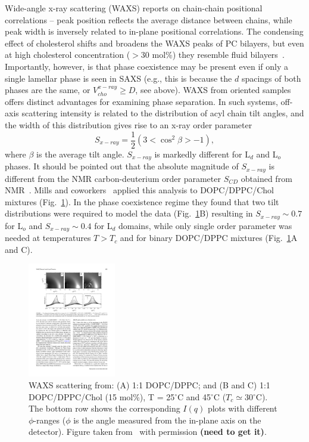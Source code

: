 \documentclass[8.5pt,twoside,twocolumn]{article}
\begin{document}
Wide-angle x-ray scattering (WAXS) reports on chain-chain positional correlations -- peak position reflects the average distance between chains, while peak width is inversely related to in-plane positional correlations. The condensing effect of cholesterol shifts and broadens the WAXS peaks of PC bilayers, but even at high cholesterol concentration ($> 30$ mol\%) they resemble fluid bilayers~\cite{Engelman.1972}. Importantly, however, is that phase coexistence may be present even if only a single lamellar phase is seen in SAXS (e.g., this is because the $d$ spacings of both phases are the same, or $V_{cho}^{x-ray} \ge D$, see above). WAXS from oriented samples offers distinct advantages for examining phase separation. In such systems, off-axis scattering intensity is related to the distribution of acyl chain tilt angles, and the width of this distribution gives rise to an x-ray order parameter~\cite{Mills.2008b,Mills.2008}
%
\begin{equation}
	S_{x-ray}=\frac{1}{2} \left(3 <\cos^2 \beta >-1\right),
\end{equation}
%
where $\beta$ is the average tilt angle. $S_{x-ray}$ is markedly different for L$_d$ and L$_o$ phases. It should be pointed out that the absolute magnitude of $S_{x-ray}$ is different from the NMR carbon-deuterium order parameter $S_{CD}$ obtained from NMR~\cite{Mills.2008b}. Mills and coworkers~\cite{Mills.2008} applied this analysis to DOPC/DPPC/Chol mixtures (Fig.~\ref{fig:WAXS_domains}). In the phase coexistence regime they found that two tilt distributions were required to model the data (Fig.~\ref{fig:WAXS_domains}B) resulting in $S_{x-ray} \sim 0.7$ for L$_o$ and $S_{x-ray} \sim 0.4$ for L$_d$ domains, while only single order parameter was needed at temperatures $T > T_c$ and for binary DOPC/DPPC mixtures (Fig.~\ref{fig:WAXS_domains}A and C). 

\begin{figure}
	\centering
	\includegraphics[height=5cm]{figures/WAXS_domains.pdf}
	\caption{WAXS scattering from: (A) 1:1 DOPC/DPPC; and (B and C) 1:1 DOPC/DPPC/Chol (15 mol\%), T = 25$^\circ$C and 45$^\circ$C ($T_c \simeq 30$$^\circ$C). The bottom row shows the corresponding $I(q)$ plots with different $\phi$-ranges ($\phi$ is the angle measured from the in-plane axis on the detector). Figure taken from~\cite{Mills.2008} with permission \textbf{(need to get it)}.}
	\label{fig:WAXS_domains}
\end{figure}
\end{document}
